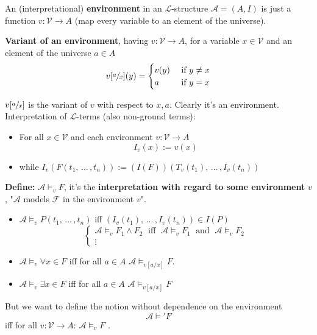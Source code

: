 \begin{definition}
	An (interpretational) \textbf{environment} in an $\mathcal{L}$-structure $\mathcal{A} = (A,I)$ is just a function $v: \mathcal{V} \rightarrow A$ (map every variable to an element of the universe).\\
\end{definition}

\begin{definition}
	\textbf{Variant of an environment}, having $v: \mathcal{V} \rightarrow A$, for a variable $x \in \mathcal{V}$ and an element of the universe $a \in A$
	$$ v[\sfrac{a}{x}] (y) = 
	\begin{cases}
		v(y) & \text{ if } y \neq x \\
		a & \text{ if } y = x
	\end{cases}
	$$
\end{definition}
$v[\sfrac{a}{x}]$ is the variant of $v$ with respect to $x,a$. Clearly it's an environment.\\

Interpretation of $\mathcal{L}$-terms (also non-ground terms):
\begin{itemize}
	\item For all $x \in \mathcal{V}$ and each environment $v: \mathcal{V} \rightarrow A$
	$$ I_v (x) := v(x) $$
	\item while $I_v (F(t_1, \, \dots \, , t_n)) := (I(F))(T_v(t_1), \, \dots \, , I_v (t_n))$
\end{itemize} \nn

\textbf{Define:} $\mathcal{A} \models_v F$, it's the \textbf{interpretation with regard to some environment} $v$, "$\mathcal{A}$ models $\mathcal{F}$ in the environment $v$".
\begin{itemize}
	\item $\mathcal{A} \models_v P(t_1, \, \dots \, , t_n)$ iff $(I_v (t_1), \, \dots \, , I_v (t_n)) \in I(P)$
	$$
	\begin{cases}
		\mathcal{A} \models_v F_1 \wedge F_2 \; \text{ iff } \; \mathcal{A} \models_v F_1 \; \text{ and } \; \mathcal{A} \models_v F_2 \\
		\vdots 
	\end{cases}
	$$
	\item $\mathcal{A} \models_v \forall x \in F$ iff for all $a \in A$ $\mathcal{A} \models_{v [a/x]} F$.\\
	\item $\mathcal{A} \models_v \exists x \in F$ iff for all $a \in A$ $\mathcal{A} \models_{v [a/x]} F$
\end{itemize}

\newpage

But we want to define the notion without dependence on the environment
$$ \mathcal{A} \models' F$$
iff for all $v: \mathcal{V} \rightarrow A$: $\mathcal{A} \models_v F$ .\\

%	
%	

